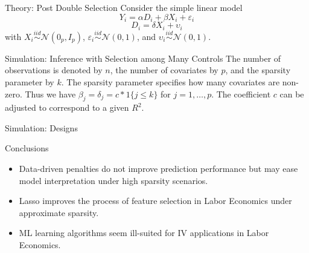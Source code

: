 \documentclass{beamer}
\begin{document}
\begin{frame}{Theory: Post Double Selection}
Consider the simple linear model
\[Y_i = \alpha D_i + \beta X_i + \varepsilon_i\]
\[D_i = \delta X_i + \upsilon_i\]
with \(X_i \stackrel{iid}{\sim} \mathcal{N}(0_p,I_p)\), \(\varepsilon_i \stackrel{iid}{\sim} \mathcal{N}(0,1)\), and \(\upsilon_i \stackrel{iid}{\sim} \mathcal{N}(0,1)\).
\end{frame}

\begin{frame}{Simulation: Inference with Selection among Many Controls}
	The number of observations is denoted by \(n\), the number of covariates by \(p\), and the sparsity parameter by \(k\). The sparsity parameter specifies how many covariates are non-zero. Thus we have \(\beta_j = \delta_j = c * 1\{j \leq k\}\) for \(j = 1,\ldots,p\). The coefficient \(c\) can be adjusted to correspond to a given \(R^2\). 	
\end{frame}

\begin{frame}{Simulation: Designs}
	
\end{frame}

\begin{frame} {Conclusions}
\begin{itemize}
\item Data-driven penalties do not improve prediction performance but may ease model interpretation under high sparsity scenarios.
\item Lasso improves the process of feature selection in Labor Economics under approximate sparsity.  
\item ML learning algorithms seem  ill-suited for IV applications in Labor Economics.
\end{itemize}
\end{frame}
\end{document}
